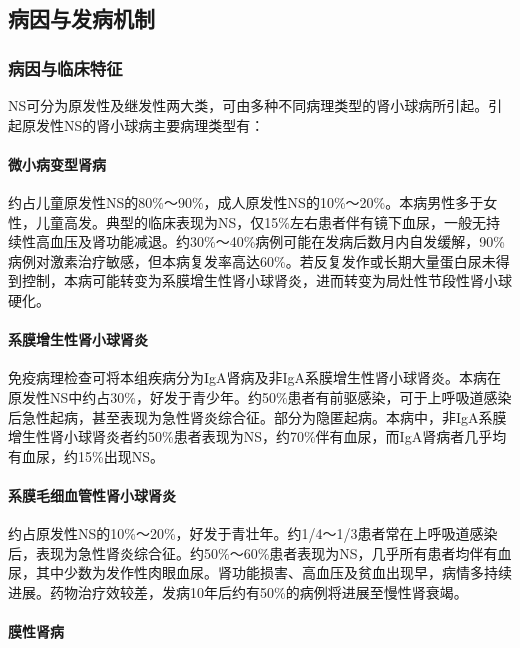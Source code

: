 \subsection{病因与发病机制}

\subsubsection{病因与临床特征}

NS可分为原发性及继发性两大类，可由多种不同病理类型的肾小球病所引起。引起原发性NS的肾小球病主要病理类型有：

\paragraph{微小病变型肾病}

约占儿童原发性NS的80\%～90\%，成人原发性NS的10\%～20\%。本病男性多于女性，儿童高发。典型的临床表现为NS，仅15\%左右患者伴有镜下血尿，一般无持续性高血压及肾功能减退。约30\%～40\%病例可能在发病后数月内自发缓解，90\%病例对激素治疗敏感，但本病复发率高达60\%。若反复发作或长期大量蛋白尿未得到控制，本病可能转变为系膜增生性肾小球肾炎，进而转变为局灶性节段性肾小球硬化。

\paragraph{系膜增生性肾小球肾炎}

免疫病理检查可将本组疾病分为IgA肾病及非IgA系膜增生性肾小球肾炎。本病在原发性NS中约占30\%，好发于青少年。约50\%患者有前驱感染，可于上呼吸道感染后急性起病，甚至表现为急性肾炎综合征。部分为隐匿起病。本病中，非IgA系膜增生性肾小球肾炎者约50\%患者表现为NS，约70\%伴有血尿，而IgA肾病者几乎均有血尿，约15\%出现NS。

\paragraph{系膜毛细血管性肾小球肾炎}

约占原发性NS的10\%～20\%，好发于青壮年。约1/4～1/3患者常在上呼吸道感染后，表现为急性肾炎综合征。约50\%～60\%患者表现为NS，几乎所有患者均伴有血尿，其中少数为发作性肉眼血尿。肾功能损害、高血压及贫血出现早，病情多持续进展。药物治疗效较差，发病10年后约有50\%的病例将进展至慢性肾衰竭。

\paragraph{膜性肾病}

